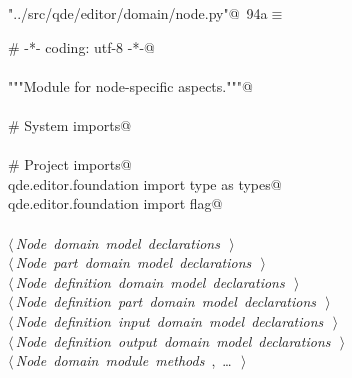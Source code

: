 \documentclass[
    a4paper,      %
    10pt,         %
    openright,    %
    notitlepage,  %
    parskip=half, %
]{scrreprt}       %
\theoremstyle{definition}                    %
\begin{document}
\begin{flushleft} \small
\begin{minipage}{\linewidth}\label{scrap154}\raggedright\small
{} \verb@"../src/qde/editor/domain/node.py"@\nobreak\ {\footnotesize {94a}}$\equiv$
\vspace{-1ex}
\begin{list}{}{} \item
\mbox{}\lstinline@# -*- coding: utf-8 -*-@\\
\mbox{}\lstinline@@\\
\mbox{}\lstinline@"""Module for node-specific aspects."""@\\
\mbox{}\lstinline@@\\
\mbox{}\lstinline@# System imports@\\
\mbox{}\lstinline@@\\
\mbox{}\lstinline@# Project imports@\\
\mbox{}\lstinline@from qde.editor.foundation import type as types@\\
\mbox{}\lstinline@from qde.editor.foundation import flag@\\
\mbox{}\lstinline@@\\
\mbox{}\lstinline@@\hbox{$\langle\,${\itshape Node domain model declarations}\nobreak\ {\footnotesize {}}$\,\rangle$}\lstinline@@\\
\mbox{}\lstinline@@\hbox{$\langle\,${\itshape Node part domain model declarations}\nobreak\ {\footnotesize {}}$\,\rangle$}\lstinline@@\\
\mbox{}\lstinline@@\hbox{$\langle\,${\itshape Node definition domain model declarations}\nobreak\ {\footnotesize {}}$\,\rangle$}\lstinline@@\\
\mbox{}\lstinline@@\hbox{$\langle\,${\itshape Node definition part domain model declarations}\nobreak\ {\footnotesize {}}$\,\rangle$}\lstinline@@\\
\mbox{}\lstinline@@\hbox{$\langle\,${\itshape Node definition input domain model declarations}\nobreak\ {\footnotesize {}}$\,\rangle$}\lstinline@@\\
\mbox{}\lstinline@@\hbox{$\langle\,${\itshape Node definition output domain model declarations}\nobreak\ {\footnotesize {}}$\,\rangle$}\lstinline@@\\
\mbox{}\lstinline@@\hbox{$\langle\,${\itshape Node domain module methods}\nobreak\ {\footnotesize {}, \ldots\ }$\,\rangle$}\lstinline@@\\
\mbox{}\lstinline@@{\NWsep}
\end{list}
\vspace{-1.5ex}
\footnotesize
\begin{list}{}{\setlength{\itemsep}{-\parsep}\setlength{\itemindent}{-\leftmargin}}

\item{}
\end{list}
\end{minipage}\vspace{4ex}
\end{flushleft}
\end{document}
